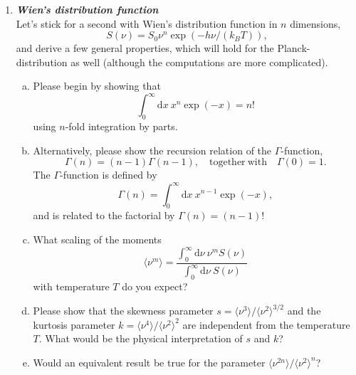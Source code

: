 \documentclass[a4paper,12pt]{article}
\newcommand{\question}[1]{\textbf{\textit{#1}}}
\newcommand{\dd}{\mathrm{d}}
\newcommand{\bra}{\langle}
\newcommand{\ket}{\rangle}
\begin{document}
\begin{enumerate}
\item \question{Wien's distribution function}\\
Let's stick for a second with Wien's distribution function in $n$ dimensions,
\begin{equation}
S(\nu) = S_0\nu^n\exp(-h\nu/(k_BT)),
\end{equation}
and derive a few general properties, which will hold for the Planck-distribution as well (although the computations are more complicated).
\begin{enumerate}[(a)]
\item{Please begin by showing that
\begin{equation}
\int_0^\infty\dd x\:x^n\exp(-x) = n!
\end{equation}
using $n$-fold integration by parts.}
\item{Alternatively, please show the recursion relation of the $\Gamma$-function, 
\begin{equation}
\Gamma(n) = (n-1)\Gamma(n-1),
\quad\mathrm{together~with}\quad
\Gamma(0) = 1.
\end{equation}
The $\Gamma$-function is defined by 
\begin{equation}
\Gamma(n) = \int_0^\infty\dd x\:x^{n-1}\exp(-x),
\end{equation}
and is related to the factorial by $\Gamma(n) = (n-1)!$}
\item{What scaling of the moments
\begin{equation}
\bra\nu^m\ket = \frac{\int_0^\infty\dd\nu\:\nu^mS(\nu)}{\int_0^\infty\dd\nu\:S(\nu)}
\end{equation}
with temperature $T$ do you expect?
}
\item{Please show that the skewness parameter $s = \bra\nu^3\ket/\bra\nu^2\ket^{3/2}$ and the kurtosis parameter $k = \bra\nu^4\ket/\bra\nu^2\ket^2$ are independent from the temperature $T$. What would be the physical interpretation of $s$ and $k$?}
\item{Would an equivalent result be true for the parameter $\bra\nu^{2n}\ket/\bra\nu^2\ket^n$?}
\end{enumerate}


\end{enumerate}
\end{document}
